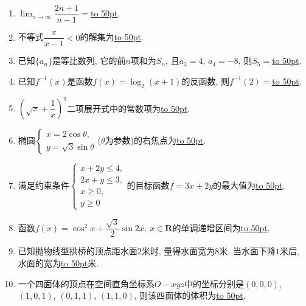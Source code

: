 \documentclass[10pt,a4paper]{article}
\newcommand{\blank}[1]{\underline{\hbox to #1pt{}}}
\begin{document}
\begin{enumerate}[1.]
\item $\displaystyle\lim_{n\to \infty}\dfrac{2n+1}{n-1}=$\blank{50}.
\item 不等式$\dfrac x{x-1}<0$的解集为\blank{50}.
\item 已知$\{a_n\}$是等比数列, 它的前$n$项和为$S_n$, 且$a_3=4$, $a_4=-8$, 则$S_5=$\blank{50}.
\item 已知$f^{-1}(x)$是函数$f(x)=\log_2(x+1)$的反函数, 则$f^{-1}(2)=$\blank{50}.
\item $(\sqrt x+\dfrac1x)^9$二项展开式中的常数项为\blank{50}.
\item 椭圆$\begin{cases} x=2 \cos\theta, \\ y=\sqrt3\sin\theta  \end{cases}$($\theta$为参数)的右焦点为\blank{50}.
\item 满足约束条件$\begin{cases} x+2y\le 4, \\ 2x+y\le 3, \\ x\ge 0, \\ y\ge 0 \end{cases}$的目标函数$f=3x+2y$的最大值为\blank{50}.
\item 函数$f(x)=\cos^2 x+\dfrac{\sqrt3}2\sin 2x,\ x\in \mathbf{R}$的单调递增区间为\blank{50}.
\item 已知抛物线型拱桥的顶点距水面$2$米时, 量得水面宽为$8$米. 当水面下降$1$米后, 水面的宽为\blank{50}米.
\item 一个四面体的顶点在空间直角坐标系$O-xyz$中的坐标分别是$(0,0,0)$, $(1,0,1)$, $(0,1,1)$, $(1,1,0)$, 则该四面体的体积为\blank{50}.



\end{enumerate}
\end{document}
